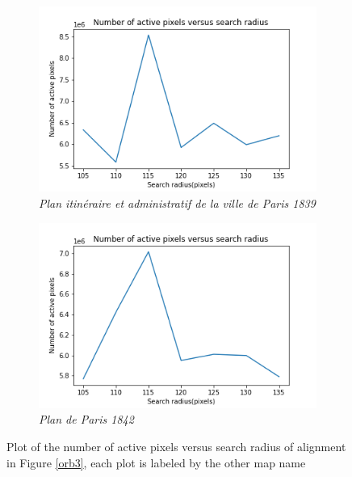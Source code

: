 \begin{figure}[h!]
     \centering
     \captionsetup{width=.9\textwidth, justification=centering}
     \begin{subfigure}{0.48\textwidth}
         \centering
         \includegraphics[width=\textwidth]{Images/Map other/similarity_versus_radius_map_13.png}
         \caption{\textit{Plan itinéraire et administratif de la ville de Paris 1839}}
     \end{subfigure}
     \hfill
     \begin{subfigure}{0.48\textwidth}
         \centering
         \includegraphics[width=\textwidth]{Images/Map other/similarity_versus_radius_map_22.png}
         \caption{\textit{Plan de Paris 1842}}
     \end{subfigure}
        \caption{Plot of the number of active pixels versus search radius of alignment in Figure \ref{orb3}, each plot is labeled by the other map name}
        \label{search3}
\end{figure}

